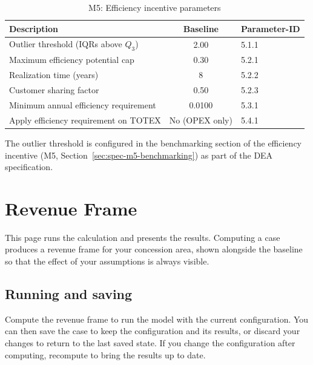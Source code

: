 \begin{table}[H]
\centering
\begin{singlespace}
\footnotesize
\begin{threeparttable}
\caption{M5: Efficiency incentive parameters}
\label{tab:app-m5}
\begin{tabular}{@{}p{9cm}cl@{}}
\toprule
\textbf{Description} & \textbf{Baseline} & \textbf{Parameter-ID} \\
\midrule
Outlier threshold (IQRs above $Q_{3}$)\tnote{a} & 2.00 & 5.1.1 \\
Maximum efficiency potential cap & 0.30 & 5.2.1 \\
Realization time (years) & 8 & 5.2.2 \\
Customer sharing factor & 0.50 & 5.2.3 \\
Minimum annual efficiency requirement & 0.0100 & 5.3.1 \\
Apply efficiency requirement on TOTEX & No (OPEX only) & 5.4.1 \\
\bottomrule
\end{tabular}
\begin{tablenotes}
\item[a] The outlier threshold is configured in the benchmarking section of the efficiency incentive (M5, Section~\ref{sec:spec-m5-benchmarking}) as part of the DEA specification.
\end{tablenotes}
\end{threeparttable}
\end{singlespace}
\end{table}


\section{Revenue Frame}
\label{sec:page-rf}

This page runs the calculation and presents the results. Computing a case produces a revenue frame for your concession area, shown alongside the baseline so that the effect of your assumptions is always visible.

\subsection{Running and saving}
Compute the revenue frame to run the model with the current configuration. You can then save the case to keep the configuration and its results, or discard your changes to return to the last saved state. If you change the configuration after computing, recompute to bring the results up to date.

